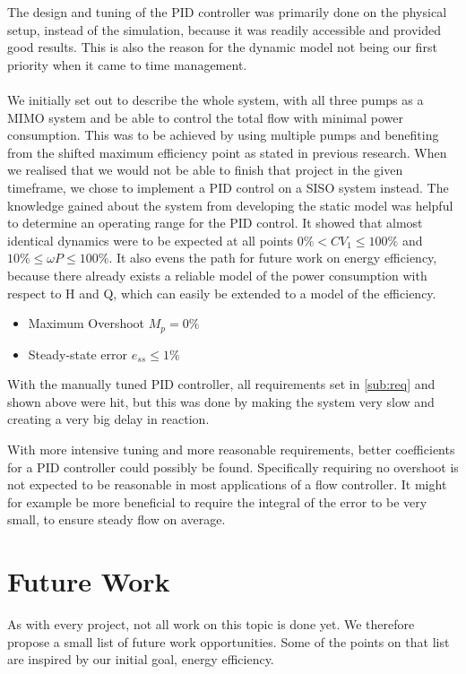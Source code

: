 The design and tuning of the PID controller was primarily done on the physical setup,
instead of the simulation, because it was readily accessible
and provided good results.
This is also the reason for the dynamic model not being our first priority when it came to time management.
\\\\We initially set out to describe the whole system,
with all three pumps as a MIMO system and be able to control the total flow with minimal power consumption.
This was to be achieved by using multiple pumps and benefiting from the shifted maximum efficiency point as stated in previous research.
When we realised that we would not be able to finish that project in the given timeframe,
we chose to implement a PID control on a SISO system instead.
The knowledge gained about the system from developing the static model was helpful to determine an operating range for the PID control.
It showed that almost identical dynamics were to be expected at all points
$0\%<CV_1\leq100\%$ and $10\%\leq\omega P\leq100\%$.
It also evens the path for future work on energy efficiency,
because there already exists a reliable model of the power consumption with respect to H and Q,
which can easily be extended to a model of the efficiency.

\begin{itemize}
\item Maximum Overshoot $M_p = 0\%$
\item Steady-state error $e_{ss} \leq 1 \%$
\end{itemize}

With the manually tuned PID controller,
all requirements set in \ref{sub:req} and shown above were hit,
but this was done by making the system very slow and creating a very big delay in reaction.

With more intensive tuning and more reasonable requirements,
better coefficients for a PID controller could possibly be found.
Specifically requiring no overshoot is not expected to be reasonable in most applications of a flow controller.
It might for example be more beneficial to require the integral of the error to be very small,
to ensure steady flow on average.

\section{Future Work} \label{sec:future}
As with every project, not all work on this topic is done yet.
We therefore propose a small list of future work opportunities.
Some of the points on that list are inspired by our initial goal,
energy efficiency.

